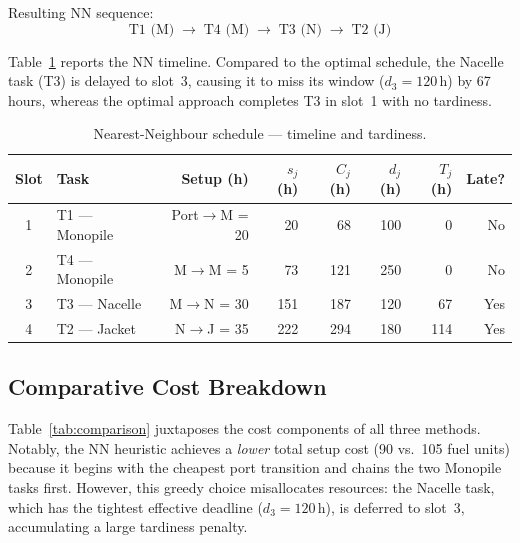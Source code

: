 \documentclass[11pt,a4paper]{article}
\begin{document}
\noindent Resulting NN sequence:
\begin{equation}
    \text{T1 (M)} \;\to\; \text{T4 (M)} \;\to\; \text{T3 (N)} \;\to\; \text{T2 (J)}
    \label{eq:nn_seq}
\end{equation}

Table~\ref{tab:nn_timeline} reports the NN timeline. Compared to the optimal
schedule, the Nacelle task (T3) is delayed to slot~3, causing it to miss its
window ($d_3 = 120$\,h) by 67 hours, whereas the optimal approach completes
T3 in slot~1 with no tardiness.

\begin{table}[H]
\centering
\caption{Nearest-Neighbour schedule — timeline and tardiness.}
\label{tab:nn_timeline}
\begin{tabular}{clrrrrrr}
\toprule
\textbf{Slot} & \textbf{Task} & \textbf{Setup (h)} & \textbf{$s_j$ (h)} & \textbf{$C_j$ (h)} & \textbf{$d_j$ (h)} & \textbf{$T_j$ (h)} & \textbf{Late?} \\
\midrule
1 & T1 — Monopile & Port$\to$M = 20 & 20  &  68 & 100 &   0 & No  \\
2 & T4 — Monopile & M$\to$M = 5     & 73  & 121 & 250 &   0 & No  \\
3 & T3 — Nacelle  & M$\to$N = 30    & 151 & 187 & 120 &  67 & Yes \\
4 & T2 — Jacket   & N$\to$J = 35    & 222 & 294 & 180 & 114 & Yes \\
\bottomrule
\end{tabular}
\end{table}

\subsection{Comparative Cost Breakdown}

Table~\ref{tab:comparison} juxtaposes the cost components of all three
methods. Notably, the NN heuristic achieves a \emph{lower} total setup cost
(90 vs.\ 105 fuel units) because it begins with the cheapest port transition
and chains the two Monopile tasks first. However, this greedy choice
misallocates resources: the Nacelle task, which has the tightest effective
deadline ($d_3 = 120$\,h), is deferred to slot~3, accumulating a large
tardiness penalty.
\end{document}
